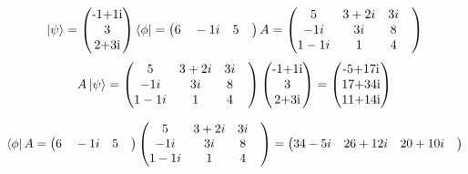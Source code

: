 \documentclass[10pt,a4paper]{article}
\begin{document}
\begin{align}
\ket{\psi} = \begin{pmatrix}
$-1+1i$\\$3$\\$2+3i$\\\end{pmatrix}
\bra{\phi} = \begin{pmatrix}
6\quad-1i\quad5\quad\end{pmatrix}A = \begin{pmatrix}
5&3+2i &3i &\\-1i &3i &8&\\1-1i &1&4&\\\end{pmatrix}
\end{align}
\begin{align}
A\ket{\psi} = \begin{pmatrix}
5&3+2i &3i &\\-1i &3i &8&\\1-1i &1&4&\\\end{pmatrix}\begin{pmatrix}
$-1+1i$\\
$3$\\
$2+3i$\\
\end{pmatrix}=\begin{pmatrix}
$-5+17i$\\
$17+34i$\\
$11+14i$\\
\end{pmatrix}\end{align}

\begin{align}
\bra{\phi}A = \begin{pmatrix}
6\quad-1i\quad5\quad\end{pmatrix}\begin{pmatrix}
5&3+2i &3i &\\-1i &3i &8&\\1-1i &1&4&\\\end{pmatrix}=\begin{pmatrix}
34-5i\quad26+12i\quad20+10i\quad\end{pmatrix}\end{align}
\end{document}
